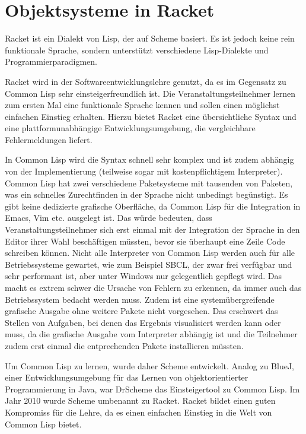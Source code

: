\chapter{Objektsysteme in Racket}
Racket ist ein Dialekt von Lisp, der auf Scheme basiert. Es ist jedoch keine rein funktionale Sprache, sondern unterstützt verschiedene Lisp-Dialekte und  Programmierparadigmen. 

Racket wird in der Softwareentwicklungslehre genutzt, da es im Gegensatz zu Common Lisp sehr einsteigerfreundlich ist. Die Veranstaltungsteilnehmer lernen zum ersten Mal eine funktionale Sprache kennen und sollen einen möglichst einfachen Einstieg erhalten. Hierzu bietet Racket eine übersichtliche Syntax und eine plattformunabhängige Entwicklungsumgebung, die vergleichbare Fehlermeldungen liefert.

In Common Lisp wird die Syntax schnell sehr komplex und ist zudem abhängig von der Implementierung (teilweise sogar mit kostenpflichtigem Interpreter). Common Lisp hat zwei verschiedene Paketsysteme mit tausenden von Paketen, was ein schnelles Zurechtfinden in der Sprache nicht unbedingt begünstigt. Es gibt keine dedizierte grafische Oberfläche, da Common Lisp für die Integration in Emacs, Vim etc. ausgelegt ist. Das würde bedeuten, dass Veranstaltungsteilnehmer sich erst einmal mit der Integration der Sprache in den Editor ihrer Wahl beschäftigen müssten, bevor sie überhaupt eine Zeile Code schreiben können. Nicht alle Interpreter von Common Lisp werden auch für alle Betriebssysteme gewartet, wie zum Beispiel SBCL, der zwar frei verfügbar und sehr performant ist, aber unter Windows nur gelegentlich gepflegt wird. Das macht es extrem schwer die Ursache von Fehlern zu erkennen, da immer auch das Betriebssystem bedacht werden muss. Zudem ist eine systemübergreifende grafische Ausgabe ohne weitere Pakete nicht vorgesehen. Das erschwert das Stellen von Aufgaben, bei denen das Ergebnis visualisiert werden kann oder muss, da die grafische Ausgabe vom Interpreter abhängig ist und die Teilnehmer zudem erst einmal die entprechenden Pakete installieren müssten. 

Um Common Lisp zu lernen, wurde daher Scheme entwickelt. Analog zu BlueJ, einer Entwicklungsumgebung für das Lernen von objektorientierter Programmierung in Java, war DrScheme das Einsteigertool zu Common Lisp. Im Jahr 2010 wurde Scheme umbenannt zu Racket. Racket bildet einen guten Kompromiss für die Lehre, da es einen einfachen Einstieg in die Welt von Common Lisp bietet.

